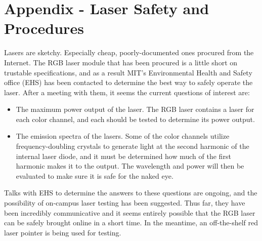 \documentclass[11pt]{article}
\begin{document}
\section{Appendix - Laser Safety and Procedures}
Lasers are sketchy. Especially cheap, poorly-documented ones procured from the Internet. The RGB laser module that has been procured is a little short on trustable specifications, and as a result MIT's Environmental Health and Safety office (EHS) has been contacted to determine the best way to safely operate the laser. After a meeting with them, it seems the current questions of interest are:

\begin{itemize}
    \item The maximum power output of the laser. The RGB laser contains a laser for each color channel, and each should be tested to determine its power output.
    
    \item The emission spectra of the lasers. Some of the color channels utilize frequency-doubling crystals to generate light at the second harmonic of the internal laser diode, and it must be determined how much of the first harmonic makes it to the output. The wavelength and power will then be evaluated to make sure it is safe for the naked eye.
\end{itemize}

\noindent Talks with EHS to determine the answers to these questions are ongoing, and the possibility of on-campus laser testing has been suggested. Thus far, they have been incredibly communicative and it seems entirely possible that the RGB laser can be safely brought online in a short time. In the meantime, an off-the-shelf red laser pointer is being used for testing. 
\end{document}
